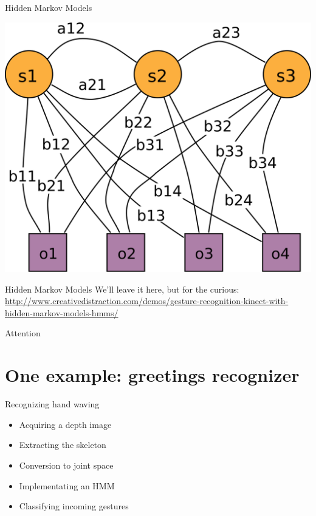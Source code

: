 \documentclass[compress]{beamer}
\begin{document}
{
\begin{frame}{Hidden Markov Models}
    \begin{center}
        \includegraphics[width=0.5\linewidth]{hmm}
    \end{center}

\end{frame}
}

\begin{frame}{Hidden Markov Models}
    We'll leave it here, but for the curious:\\
    \url{http://www.creativedistraction.com/demos/gesture-recognition-kinect-with-hidden-markov-models-hmms/}
\end{frame}

\begin{frame}{Attention}
\end{frame}



\section{One example: greetings recognizer}

\begin{frame}{Recognizing hand waving}
    \begin{itemize}
        \item Acquiring a depth image
        \item Extracting the skeleton
        \item Conversion to joint space
        \item Implementating an HMM
        \item Classifying incoming gestures
    \end{itemize}
\end{frame}
\end{document}
